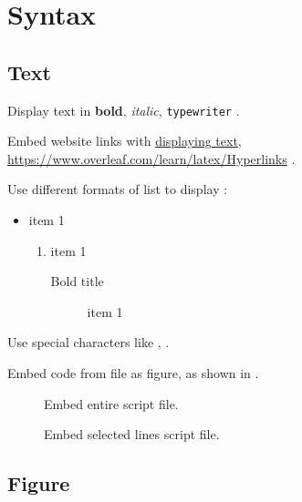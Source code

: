 \section{Syntax}

\subsection{Text}

Display text in \textbf{bold}, \textit{italic}, \texttt{typewriter} \cite{overleaf_font}.

Embed website links with \href{https://www.overleaf.com/learn/latex/Hyperlinks}{displaying text}, \url{https://www.overleaf.com/learn/latex/Hyperlinks} \cite{overleaf_link}.

Use different formats of list to display \cite{overleaf_list}:
\begin{itemize}
    \item item 1
        \begin{enumerate}
            \item item 1
                \begin{description}
                    \item[Bold title] item 1
                \end{description}
        \end{enumerate}
\end{itemize}

Use special characters like ,  \cite{pifont}.

Embed code from file as figure, as shown in .
\begin{figure}[H]

\caption{Embed entire script file.}
\label{fig:embed_ef}
\end{figure}
\begin{figure}[H]

\caption{Embed selected lines script file.}
\label{fig:embed_pf}
\end{figure}

\subsection{Figure}

